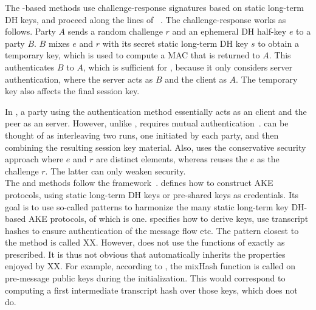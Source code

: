 \runhead{\mOptls{}}
\label{sec:optls}
The \mStat-based methods use challenge-response signatures based on static
long-term DH keys, and proceed along the lines of
\mOptls~\cite{DBLP:conf/eurosp/KrawczykW16}.
%
The challenge-response works as follows.
Party $A$ sends a random challenge $r$
and an ephemeral DH half-key $e$ to a party $B$.
%
$B$ mixes $e$ and $r$ with its secret static
long-term DH key $s$ to obtain a temporary key, which
%
is used to compute a MAC that is returned to 
$A$.
%
This authenticates $B$ to $A$, which is sufficient for \mOptls, 
because it only considers server authentication, where the server acts as $B$
and the client as $A$.
%
The temporary key also affects the final session key.
%

In \mEdhoc, a party using the \mStat{} authentication method
essentially acts as an \mOptls{} client and the peer as an \mOptls{}
server.
%
However, unlike \mOptls{}, \mEdhoc{} requires mutual
authentication~\cite{ietf-lake-reqs-04}.
%
\mStatStat{} can be thought of as interleaving two \mOptls{}
runs, one initiated by each party, and then combining the resulting session key
material.
%
Also, \mOptls{} uses the conservative security approach where $e$ and $r$
are distinct elements, whereas \mEdhoc{} reuses the $e$ as the challenge $r$.
%
The latter can only weaken security.\\
%

\runhead{\mNoise{}}
The \mStatStat{} and \mPskPsk{} methods follow the \mNoise{}
framework~\cite{perrin2016noise}.
%
\mNoise{} defines how to construct AKE protocols, using static long-term DH
keys or pre-shared keys as credentials.
%
Its goal is to use so-called patterns to harmonize the many static long-term
key DH-based AKE protocols, of which \mOptls{} is one.
%
\mNoise{} specifies how to derive keys, use transcript hashes to ensure
authentication of the message flow etc.
%
The \mNoise{} pattern closest to the \mStatStat{} method is called XX.
%
However, \mEdhoc{} does not use the functions of \mNoise{} exactly as
prescribed.
%
It is thus not obvious that \mEdhoc{} automatically inherits
the properties enjoyed by XX.
%
For example, according to \mNoise{}, the mixHash function is called on
pre-message public keys during the initialization.
%
This would correspond to \mEdhoc{} computing a first intermediate transcript
hash over those keys, which \mEdhoc{} does not do.
%

